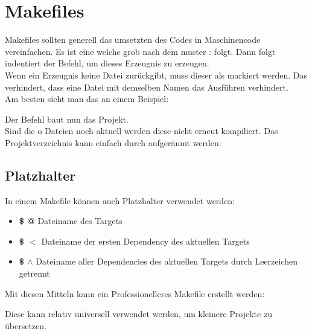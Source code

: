 \section{Makefiles}

Makefiles sollten generell das umsetzten des Codes in Maschinencode vereinfachen.
Es ist eine  welche grob nach dem muster  :  folgt. 
Dann folgt indentiert der Befehl, um dieses Erzeugnis zu erzeugen.\\
Wenn ein Erzeugnis keine Datei zurückgibt, muss dieser als  markiert werden. 
Das verhindert, dass eine Datei mit demselben Namen das Ausführen verhindert.\\
Am besten sieht man das an einem Beispiel:



Der Befehl  baut nun das Projekt.\\
Sind die o Dateien noch aktuell werden diese nicht erneut kompiliert. 
Das Projektverzeichnis kann einfach durch  aufgeräumt werden.

\subsection{Platzhalter}

In einem Makefile können auch Platzhalter verwendet werden:

\begin{itemize}[itemsep=1pt, parsep=0pt]
    \item \textbf{\$ @} Dateiname des Targets
    \item \textbf{\$ $<$} Dateiname der ersten Dependency des aktuellen Targets
    \item \textbf{\$ $\wedge$} Dateiname aller Dependencies des aktuellen Targets durch Leerzeichen getrennt
\end{itemize}

Mit diesen Mitteln kann ein Professionelleres Makefile erstellt werden:



Diese kann relativ universell verwendet werden, um kleinere Projekte zu übersetzen.

